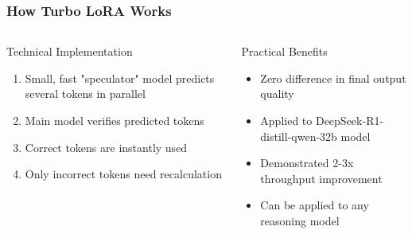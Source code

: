 \documentclass[aspectratio=169]{beamer}
\begin{document}
\begin{frame}
	\frametitle{How Turbo LoRA Works}
	\begin{columns}
		\begin{column}{0.48\textwidth}
			\begin{block}{Technical Implementation}
				\begin{enumerate}
					\item Small, fast "speculator" model predicts several tokens in parallel
					\item Main model verifies predicted tokens
					\item Correct tokens are instantly used
					\item Only incorrect tokens need recalculation
				\end{enumerate}
			\end{block}
		\end{column}
		\begin{column}{0.48\textwidth}
			\begin{block}{Practical Benefits}
				\begin{itemize}
					\item Zero difference in final output quality
					\item Applied to DeepSeek-R1-distill-qwen-32b model
					\item Demonstrated 2-3x throughput improvement
					\item Can be applied to any reasoning model
				\end{itemize}
			\end{block}
		\end{column}
	\end{columns}
	\vspace{0.5cm}
	\begin{center}
	\end{center}
\end{frame}
\end{document}
